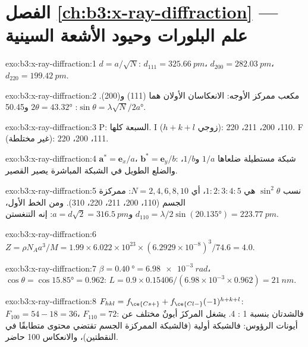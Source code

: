 \section*{الفصل \ref{ch:b3:x-ray-diffraction} --- علم البلورات وحيود الأشعة السينية}

\begin{solution}{exo:b3:x-ray-diffraction:1}
$d = a/\sqrt N$: $d_{111} = \qty{325.66}{pm}$، $d_{200} = \qty{282.03}{pm}$، $d_{220} =
\qty{199.42}{pm}$.
\end{solution}

\begin{solution}{exo:b3:x-ray-diffraction:2}
مكعب ممركز الأوجه: الانعكاسان الأولان هما (111) و(200). $\sin\theta = \lambda\sqrt N/2a$: $2\theta =
\ang{43.32}$ و\ang{50.45}.
\end{solution}

\begin{solution}{exo:b3:x-ray-diffraction:3}
P: السبعة كلها. I ($h + k + l$ زوجي): 110، 200، 211، 220. F (غير مختلطة): 111، 200، 220.
\end{solution}

\begin{solution}{exo:b3:x-ray-diffraction:4}
$\mathbf a^* = \mathbf e_x/a$، $\mathbf b^* = \mathbf e_y/b$: شبكة مستطيلة ضلعاها $1/a$
و$1/b$، والضلع الطويل في الشبكة المباشرة يصير القصير.
\end{solution}

\begin{solution}{exo:b3:x-ray-diffraction:5}
نسب $\sin^2\theta$ هي $1 : 2 : 3 : 4 : 5$، أي $N = 2, 4, 6, 8, 10$: ممركزة الجسم (110،
200، 211، 220، 310). ومن الخط الأول، $d_{110} = \lambda/2\sin(\ang{20.135}) =
\qty{223.77}{pm}$ و$a = d\sqrt2 = \qty{316.5}{pm}$: إنه التنغستن.
\end{solution}

\begin{solution}{exo:b3:x-ray-diffraction:6}
$Z = \rho N_Aa^3/M = 1.99 \times 6.022\times10^{23} \times (6.2929\times10^{-8})^3/74.6 = 4.0$.
\end{solution}

\begin{solution}{exo:b3:x-ray-diffraction:7}
$\beta = \qty{0.40}{\degree} = \qty{6.98e-3}{rad}$، $\cos\theta = \cos\ang{15.85} = 0.962$:
$L = 0.9 \times 0.15406/(6.98\times10^{-3} \times 0.962) = \qty{21}{nm}$.
\end{solution}

\begin{solution}{exo:b3:x-ray-diffraction:8}
$F_{hkl} = f_{\ce{Cs+}} + f_{\ce{Cl-}}(-1)^{h+k+l}$: $F_{100} = 54 - 18 = 36$، $F_{110} = 72$:
فالشدتان بنسبة 1 : 4. يشغل المركزَ أيونٌ مختلف عن أيونات
الرؤوس: فالشبكة أولية (فالشبكة الممركزة الجسم تقتضي محتوى متطابقًا
في النقطتين)، والانعكاس 100 حاضر.
\end{solution}

